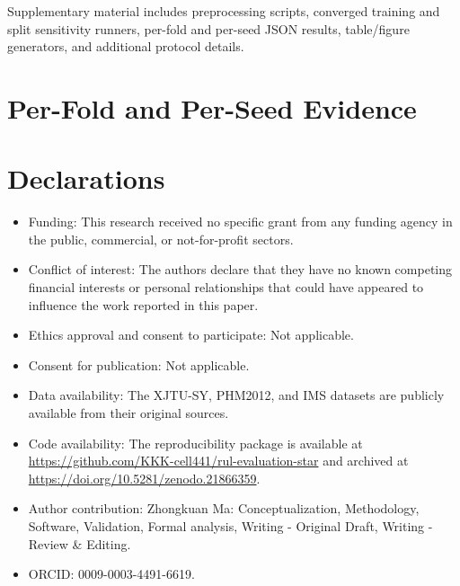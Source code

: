 \documentclass[pdflatex,sn-mathphys-num]{sn-jnl}
\begin{document}
\backmatter

Supplementary material includes preprocessing scripts, converged training and split sensitivity runners, per-fold and per-seed JSON results, table/figure generators, and additional protocol details.

\clearpage
\section{Per-Fold and Per-Seed Evidence}


\section*{Declarations}
\begin{itemize}
\item Funding: This research received no specific grant from any funding agency in the public, commercial, or not-for-profit sectors.
\item Conflict of interest: The authors declare that they have no known competing financial interests or personal relationships that could have appeared to influence the work reported in this paper.
\item Ethics approval and consent to participate: Not applicable.
\item Consent for publication: Not applicable.
\item Data availability: The XJTU-SY, PHM2012, and IMS datasets are publicly available from their original sources.
\item Code availability: The reproducibility package is available at \url{https://github.com/KKK-cell441/rul-evaluation-star} and archived at \url{https://doi.org/10.5281/zenodo.21866359}.
\item Author contribution: Zhongkuan Ma: Conceptualization, Methodology, Software, Validation, Formal analysis, Writing - Original Draft, Writing - Review \& Editing.
\item ORCID: 0009-0003-4491-6619.
\end{itemize}
\end{document}
